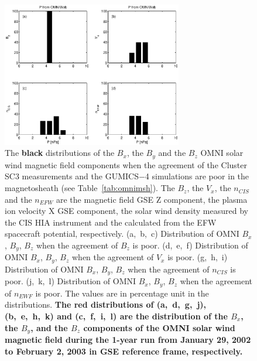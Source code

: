 \documentclass[linenumbers,draft]{agujournal}
\begin{document}
\begin{figure}[h]
\centering
\includegraphics[width=0.7\textwidth,angle=0]{swe-2020-corr-f16}
\caption{The \textbf{black} distributions of the $B_{x}$, the $B_{y}$  and the $B_{z}$ OMNI solar wind magnetic field components when the agreement of the Cluster SC3 measurements and the GUMICS$-$4 simulations are poor in the magnetosheath (see Table~\ref{tab:omnimsh}). The $B_{z}$, the $V_{x}$, the $n_{CIS}$ and the $n_{EFW}$ are the magnetic field GSE Z component, the plasma ion velocity X GSE component, the  solar wind density measured by the CIS HIA instrument and the calculated from the EFW spacecraft potential, respectively. (a,~b,~c) Distribution of OMNI $B_{x}$, $B_{y}$, $B_{z}$ when the agreement of $B_{z}$ is poor. (d,~e,~f) Distribution of OMNI  $B_{x}$, $B_{y}$, $B_{z}$ when the agreement of $V_{x}$ is poor. (g,~h,~i) Distribution of OMNI $B_{x}$, $B_{y}$, $B_{z}$ when the agreement of $n_{CIS}$ is poor. (j,~k,~l) Distribution of OMNI $B_{x}$, $B_{y}$, $B_{z}$ when the agreement of $n_{EWF}$ is poor. The values are in percentage unit in the distributions. \textbf{The red distributions of (a,~d,~g,~j), (b,~e,~h,~k) and (c,~f,~i,~l) are the distribution of the $B_{x}$, the $B_{y}$, and the $B_{z}$ components of the OMNI solar wind magnetic field during the 1-year run from January 29, 2002 to February 2, 2003 in GSE reference frame, respectively.}}
\label{fig:mshomnibxyz}
\end{figure}

\pagebreak
\end{document}
